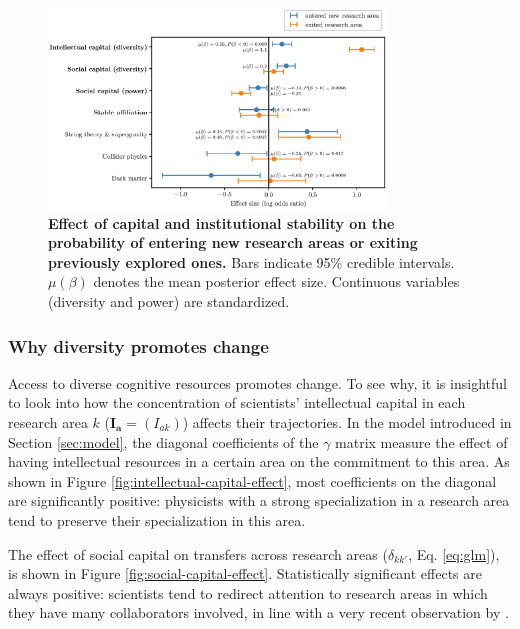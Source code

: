\documentclass{article}
\begin{document}
\begin{figure}[h]
    \centering
    \includegraphics[width=0.8\textwidth]{plots/Fig6.eps}
    \caption{\textbf{Effect of capital and institutional stability on the probability of entering new research areas or exiting previously explored ones.} Bars indicate 95\% credible intervals. $\mu(\beta)$ denotes the mean posterior effect size. Continuous variables (diversity and power) are standardized.}
    \label{fig:diversification_score_effect}
\end{figure}


\subsubsection{Why diversity promotes change}

Access to diverse cognitive resources promotes change. To see why, it is insightful to look into how the concentration of scientists' intellectual capital in each research area $k$ ($\bm{I_a}=(I_{ak})$) affects their trajectories. In the model introduced in Section \ref{sec:model}, the diagonal coefficients of the $\gamma$ matrix measure the effect of having intellectual resources in a certain area on the commitment to this area. As shown in Figure \ref{fig:intellectual-capital-effect}, most coefficients on the diagonal are significantly positive: physicists with a strong specialization in a research area tend to preserve their specialization in this area.

The effect of social capital on transfers across research areas ($\delta_{kk'}$, Eq. \ref{eq:glm}), is shown in Figure \ref{fig:social-capital-effect}. Statistically significant effects are always positive: scientists tend to redirect attention to research areas in which they have many collaborators involved, in line with a very recent observation by \citeauthor{Venturini2024} \citealt{Venturini2024}.
\end{document}
